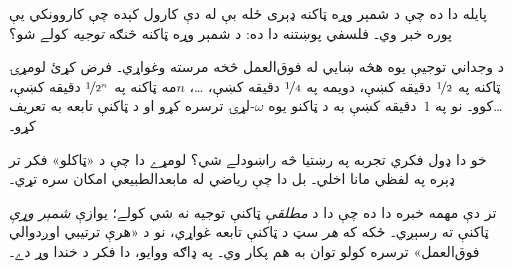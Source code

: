 \documentclass[../../../include/open-logic-section]{subfiles}
\begin{document}
پايله دا ده چې د شمېر وړه ټاکنه ډېری
ځله بې له دې کارول کېده چې کاروونکي
يې پوره خبر وي۔ فلسفي پوښتنه دا ده:
د شمېر وړه ټاکنه څنګه \emph{توجيه}
کولے شو؟

د وجداني توجيې يوه هڅه ښايي
له فوق‌العمل څخه مرسته وغواړي۔ فرض
کړئ لومړۍ ټاکنه په $\nicefrac{1}{2}$
دقيقه کښې، دويمه په
$\nicefrac{1}{4}$ دقيقه کښې، \dots،
$n$مه ټاکنه په
$\nicefrac{1}{2^n}$ دقيقه کښې،
\dots\@ کوو۔ نو په $1$~دقيقه کښې
به د ټاکنو يوه $\omega$-لړۍ
ترسره کړو او د ټاکنې تابعه به
تعريف کړو۔

خو دا ډول فکري تجربه په رښتيا څه
راښودلے شي؟ لومړے دا چې د «ټاکلو»
فکر تر ډېره په لفظي مانا اخلي۔
بل دا چې رياضي له مابعدالطبيعي
امکان سره تړي۔

تر دې مهمه خبره دا ده چې دا د
\emph{مطلقې} ټاکنې توجيه نه شي
کولے؛ يوازې \emph{شمېر وړې} ټاکنې
ته رسېږي۔ ځکه که \emph{هر} سټ
د ټاکنې تابعه غواړي، نو د «هرې
ترتيبي اوږدوالي فوق‌العمل» ترسره
کولو توان به هم پکار وي۔ په ډاګه
ووايو، دا فکر د خندا وړ دے۔
\end{document}
